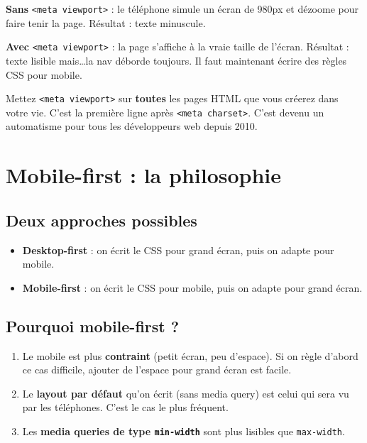 \documentclass[11pt,a4paper]{article}
\begin{document}
\begin{infobox}
\textbf{Sans} \texttt{<meta viewport>} : le téléphone simule un écran de
980px et dézoome pour faire tenir la page. Résultat : texte minuscule.

\textbf{Avec} \texttt{<meta viewport>} : la page s'affiche à la vraie
taille de l'écran. Résultat : texte lisible mais\ldots la nav déborde
toujours. Il faut maintenant écrire des règles CSS pour mobile.
\end{infobox}

\begin{attentionbox}
Mettez \texttt{<meta viewport>} sur \textbf{toutes} les pages HTML que
vous créerez dans votre vie. C'est la première ligne après
\texttt{<meta charset>}. C'est devenu un automatisme pour tous les
développeurs web depuis 2010.
\end{attentionbox}

\newpage

\section{Mobile-first : la philosophie}

\subsection{Deux approches possibles}

\begin{itemize}[leftmargin=*,nosep]
    \item \textbf{Desktop-first} : on écrit le CSS pour grand écran, puis on adapte pour mobile.
    \item \textbf{Mobile-first} : on écrit le CSS pour mobile, puis on adapte pour grand écran.
\end{itemize}

\subsection{Pourquoi mobile-first ?}

\begin{enumerate}[leftmargin=*,nosep]
    \item Le mobile est plus \textbf{contraint} (petit écran, peu d'espace). Si on règle d'abord ce cas difficile, ajouter de l'espace pour grand écran est facile.
    \item Le \textbf{layout par défaut} qu'on écrit (sans media query) est celui qui sera vu par les téléphones. C'est le cas le plus fréquent.
    \item Les \textbf{media queries de type \texttt{min-width}} sont plus lisibles que \texttt{max-width}.
\end{enumerate}
\end{document}
